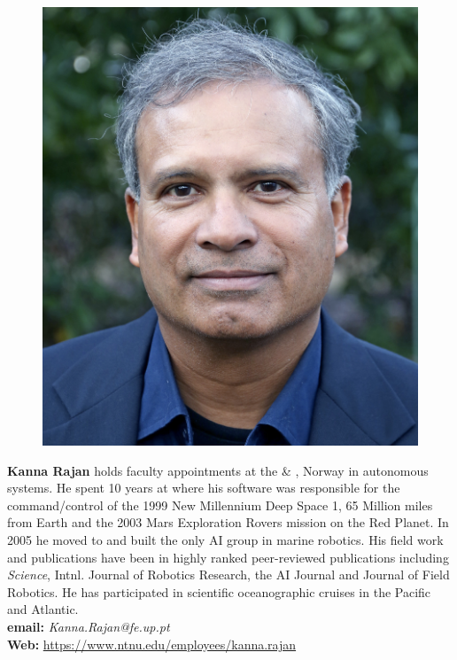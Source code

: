 \documentclass[12pt]{article}
\begin{document}
\parbox{6.25in}{
\begin{figure}
  \centering
  \includegraphics[width=.75\linewidth]{fig/Krajan.png}
\end{figure}
\textbf{Kanna Rajan} holds faculty appointments at the \univ \&
\univne, Norway in autonomous systems. He spent 10 years at \inst
where his software was responsible for the command/control of the 1999
New Millennium Deep Space 1, 65 Million miles from Earth and the 2003
Mars Exploration Rovers mission on the Red Planet. In 2005 he moved to
\mba and built the only AI group in marine robotics. His field work
and publications have been in highly ranked peer-reviewed publications
including \emph{Science}, Intnl. Journal of Robotics Research, the AI
Journal and Journal of Field Robotics. He has participated in
scientific oceanographic cruises in the Pacific and Atlantic.
\\
\textbf{email: }\emph{Kanna.Rajan@fe.up.pt}\\
\textbf{Web:
}\url{https://www.ntnu.edu/employees/kanna.rajan}}\footnotemark{}

\newpage
\end{document}
